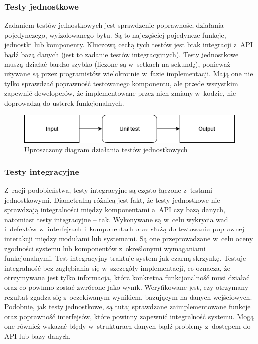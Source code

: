 \documentclass[oneside,polski,logo]{amuthesis}
\begin{document}
\subsubsection {Testy jednostkowe}
Zadaniem testów jednostkowych jest sprawdzenie poprawności działania pojedynczego, wyizolowanego bytu. Są to najczęściej pojedyncze funkcje, jednostki lub komponenty. Kluczową cechą tych testów jest brak integracji z~API bądź bazą danych (jest to zadanie testów integracyjnych). Testy jednostkowe muszą działać bardzo szybko (liczone są w~setkach na sekundę), ponieważ używane są przez programistów wielokrotnie w~fazie implementacji. Mają one nie tylko sprawdzać poprawność testowanego komponentu, ale przede wszystkim zapewnić deweloperów, że implementowane przez nich zmiany w~kodzie, nie doprowadzą do usterek funkcjonalnych. \cite{testJ}
\newpage

\begin{figure}[h]
	\centering
	\includegraphics[width=12cm]{images/hyps/unit-test-flow.png}
	\caption{Uproszczony diagram działania testów jednostkowych}
\end{figure}

\subsubsection {Testy integracyjne}
Z~racji podobieństwa, testy integracyjne są często łączone z~testami jednostkowymi. Diametralną różnicą jest fakt, że testy jednostkowe nie sprawdzają integralności między komponentami a~API czy bazą danych, natomiast testy integracyjne – tak. Wykonywane są w~celu wykrycia wad i~defektów w~interfejsach i~komponentach oraz służą do testowania poprawnej interakcji między modułami lub systemami. Są one przeprowadzane w~celu oceny zgodności systemu lub komponentów z~określonymi wymaganiami funkcjonalnymi. Test integracyjny traktuje system jak czarną skrzynkę. Testuje integralność bez zagłębiania się w~szczegóły implementacji, co oznacza, że otrzymywana jest tylko informacja, która konkretna funkcjonalność musi działać oraz co powinno zostać zwrócone jako wynik. Weryfikowane jest, czy otrzymany rezultat zgadza się z~oczekiwanym wynikiem, bazującym na danych wejściowych. Podobnie, jak testy jednostkowe, są tutaj sprawdzane zaimplementowane funkcje oraz poprawność interfejsów, które powinny zapewnić integralność systemu. Mogą one również wskazać błędy w~strukturach danych bądź problemy z~dostępem do API lub bazy danych. \cite{testI}
\end{document}
